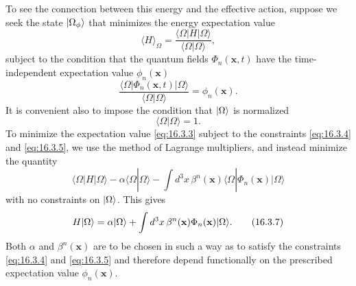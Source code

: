 To see the connection between this energy and the effective action, suppose we seek the state $\lvert \Omega_\phi\rangle$ that minimizes the energy expectation value
\begin{equation}
\langle H\rangle_\Omega
=\frac{\langle\Omega|H|\Omega\rangle}{\langle\Omega|\Omega\rangle},
\tag{16.3.3}\label{eq:16.3.3}
\end{equation}
subject to the condition that the quantum fields $\Phi_n(\mathbf{x},t)$ have the time-independent expectation value $\phi_n(\mathbf{x})$
\begin{equation}
\frac{\langle\Omega|\Phi_n(\mathbf{x},t)|\Omega\rangle}
{\langle\Omega|\Omega\rangle}
=\phi_n(\mathbf{x}).
\tag{16.3.4}\label{eq:16.3.4}
\end{equation}
It is convenient also to impose the condition that $\lvert \Omega\rangle$ is normalized
\begin{equation}
\langle\Omega|\Omega\rangle=1.
\tag{16.3.5}\label{eq:16.3.5}
\end{equation}
To minimize the expectation value \eqref{eq:16.3.3} subject to the constraints \eqref{eq:16.3.4} and \eqref{eq:16.3.5}, we use the method of Lagrange multipliers, and instead minimize the quantity
\begin{equation}
\langle\Omega|H|\Omega\rangle
-\alpha\langle\Omega|\Omega\rangle
-\int d^3x\,\beta^n(\mathbf{x})
 \langle\Omega|\Phi_n(\mathbf{x})|\Omega\rangle
\tag{16.3.6}\label{eq:16.3.6}
\end{equation}
with no constraints on $\lvert \Omega\rangle$. This gives
\begin{equation}
H\lvert \Omega\rangle=\alpha\lvert \Omega\rangle
+\int d^3x\,\beta^n(\mathbf{x})\Phi_n(\mathbf{x})\lvert \Omega\rangle.
\tag{16.3.7}\label{eq:16.3.7}
\end{equation}
Both $\alpha$ and $\beta^n(\mathbf{x})$ are to be chosen in such a way as to satisfy the constraints \eqref{eq:16.3.4} and \eqref{eq:16.3.5} and therefore depend functionally on the prescribed expectation value $\phi_n(\mathbf{x})$.

